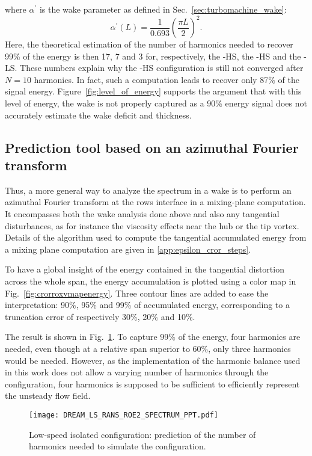 where $\alpha^\prime$ is
the wake parameter as defined in 
Sec.~\ref{sec:turbomachine_wake}:
\begin{equation}
    \alpha^\prime(L) =  \frac{1}{0.693} \left( \frac{\pi L}{2} \right)^2.
\end{equation}
Here, the theoretical estimation of the number of harmonics needed 
to recover 99\% of the energy is then
17, 7 and 3 for, respectively, the \aipx-HS, the \mockup-HS
and the \mockup-LS. These numbers explain why the 
\aipx-HS configuration is still not converged after $N=10$
harmonics. In fact, such a computation leads to recover only
87\% of the signal energy. Figure~\ref{fig:level_of_energy}
supports the argument that with this level of energy, the wake
is not properly captured as a 90\% energy signal
does not accurately estimate the wake deficit and thickness.

\subsection{Prediction tool based on an azimuthal Fourier transform}
\label{sub:prediction_tool_azimuthal_fft}
Thus, a more general way to analyze the spectrum in a wake is
to perform an azimuthal Fourier transform at the rows interface
in a mixing-plane computation. It encompasses both the wake analysis done above and also
any tangential disturbances, as for instance
the viscosity effects near the hub or the tip vortex.
Details of the algorithm used to compute the tangential accumulated
energy from a mixing plane computation are given in \ref{app:epsilon_cror_steps}.

To have a global insight of the energy contained in the
tangential distortion across the whole span,
the energy accumulation is plotted using a color map
in Fig.~\ref{fig:crorroxvmapenergy}.
Three contour lines are added to ease the
interpretation: 90\%, 95\%
and 99\% of accumulated energy, corresponding to a truncation
error of respectively 30\%, 20\% and 10\%.

The result is shown in Fig.~\ref{fig:DREAM_LS_RANS_ROE2_SPECTRUM_PPT}.
To capture 99\% of the energy, four harmonics are needed, even though
at a relative span superior to 60\%, only three harmonics would be needed.
However, as the implementation of the harmonic balance used
in this work does not allow a varying number of harmonics through the
configuration, four harmonics is supposed to be sufficient to efficiently 
represent the unsteady flow field.
\begin{figure}[htp]
  \centering
  \texttt{[image: DREAM\_LS\_RANS\_ROE2\_SPECTRUM\_PPT.pdf]}
  \caption{Low-speed isolated configuration: prediction of the number
  of harmonics needed to simulate the configuration.}
  \label{fig:DREAM_LS_RANS_ROE2_SPECTRUM_PPT}
\end{figure}

